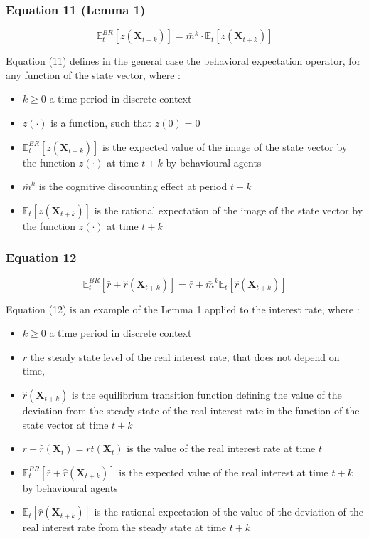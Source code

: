 \documentclass{article}
\begin{document}
\subsubsection*{Equation 11 (Lemma 1)}

\begin{equation}
    \mathbb{E}_{t}^{BR}\left[z\left(\bm{X}_{t+k}\right)\right]=\bar{m}^{k}\cdot\mathbb{E}_{t}\left[z\left(\bm{X}_{t+k}\right)\right]
\end{equation}

Equation (11) defines in the general case the behavioral expectation operator, for any function of the state vector, where : 
\begin{itemize}
    \item $k\geq 0$ a time period in discrete context
    \item $z(\cdot)$ is a function, such that $z(0)=0$
    \item $\mathbb{E}_{t}^{BR}\left[z\left(\bm{X}_{t+k}\right)\right]$ is the expected value of the image of the state vector by the function $z(\cdot)$ at time $t+k$ by behavioural agents
    \item $\bar{m}^{k}$ is the cognitive discounting effect at period $t+k$
    \item $\mathbb{E}_{t}\left[z\left(\bm{X}_{t+k}\right)\right]$ is the rational expectation of the image of the state vector by the function $z(\cdot)$ at time $t+k$
\end{itemize}

\subsubsection*{Equation 12}

\begin{equation}
    \mathbb{E}_{t}^{BR}\left[\bar{r}+\hat{r}\left(\bm{X}_{t+k}\right)\right]=\bar{r}+\bar{m}^{k}\mathbb{E}_{t}\left[\hat{r}(\bm{X}_{t+k})\right]
\end{equation}

Equation (12) is an example of the Lemma 1 applied to the interest rate, where :
\begin{itemize}
    \item $k\geq 0$ a time period in discrete context
    \item $\bar{r}$ the steady state level of the real interest rate, that does not depend on time,  
    \item $\hat{r}(\bm{X}_{t+k})$ is the equilibrium transition function defining the value of the deviation from the steady state of the real interest rate in the function of the state vector at time $t+k$
    \item $\bar{r}+\hat{r}(\bm{X}_{t})=r{t}(\bm{X}_{t})$ is the value of the real interest rate at time $t$
    \item $\mathbb{E}_{t}^{BR}\left[\bar{r}+\hat{r}(\bm{X}_{t+k})\right]$ is the expected value of the real interest at time $t+k$ by behavioural agents
    \item $\mathbb{E}_{t}\left[\hat{r}(\bm{X}_{t+k})\right]$ is the rational expectation of the value of the deviation of the real interest rate from the steady state at time $t+k$
\end{itemize}
\end{document}
